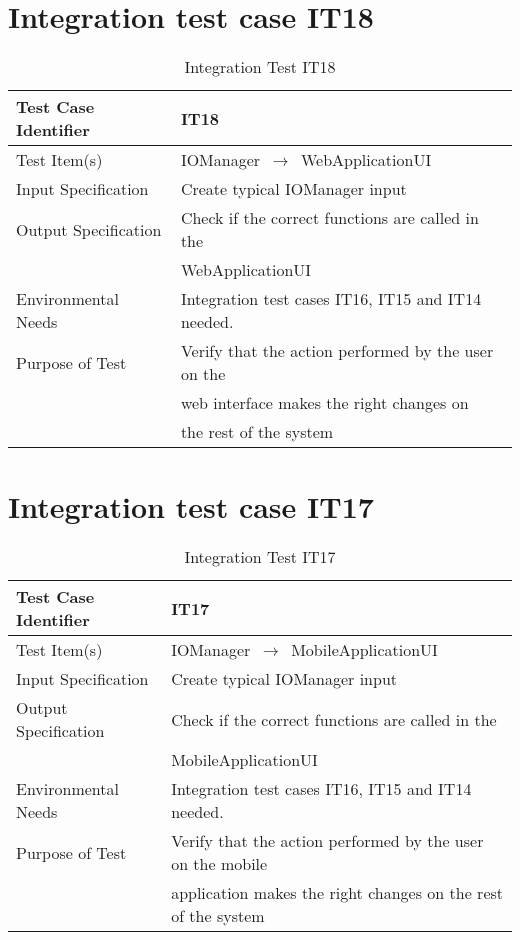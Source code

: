 \documentclass[../../testPlan.tex]{subfiles}
\begin{document}
		
	\section{Integration test case IT18}
		\begin{table}[H]
			\centering
			\label{IT18}
			\begin{tabular}{ll}
				\hline
				Test Case Identifier & IT18 \\ \hline
				Test Item(s)         & IOManager $\,\to\,$ WebApplicationUI\\ \hline
				Input Specification  & Create typical IOManager input  \\ \hline
				Output Specification & Check if the correct functions are called in the \\ & WebApplicationUI\\ \hline
				Environmental Needs  &  Integration test cases IT16, IT15 and IT14 needed. \\ \hline
				Purpose of Test      &  Verify that the action performed by the user on the \\ & web interface makes the right changes on \\ & the rest of the system  \\ \hline
			\end{tabular}
			\caption{Integration Test IT18}
		\end{table}
		
		
	\section{Integration test case IT17}
		\begin{table}[H]
			\centering
			\label{IT17}
			\begin{tabular}{ll}
				\hline
				Test Case Identifier & IT17 \\ \hline
				Test Item(s)         & IOManager $\,\to\,$ MobileApplicationUI\\ \hline
				Input Specification  & Create typical IOManager input  \\ \hline
				Output Specification & Check if the correct functions are called in the \\ & MobileApplicationUI\\ \hline
				Environmental Needs  &  Integration test cases IT16, IT15 and IT14 needed. \\ \hline
				Purpose of Test      &  Verify that the action performed by the user on the mobile \\ & application makes the right changes on the rest of the system  \\ \hline
			\end{tabular}
			\caption{Integration Test IT17}
		\end{table}
		
		
	
\end{document}
